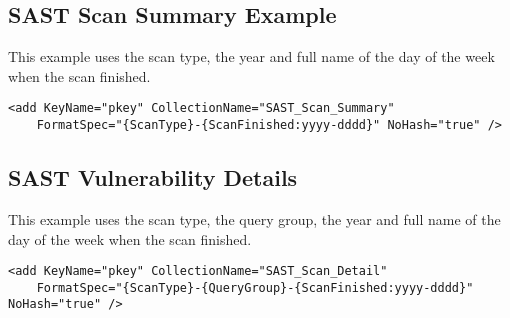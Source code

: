 \subsection{SAST Scan Summary Example}

This example uses the scan type, the year and full name of the day of the week when the scan finished.

\begin{lstlisting}
<add KeyName="pkey" CollectionName="SAST_Scan_Summary"
    FormatSpec="{ScanType}-{ScanFinished:yyyy-dddd}" NoHash="true" />
\end{lstlisting}

\subsection{SAST Vulnerability Details}

This example uses the scan type, the query group, the year and full name of the day of the week when the scan finished.

\begin{lstlisting}
<add KeyName="pkey" CollectionName="SAST_Scan_Detail"
    FormatSpec="{ScanType}-{QueryGroup}-{ScanFinished:yyyy-dddd}" NoHash="true" />
\end{lstlisting}
